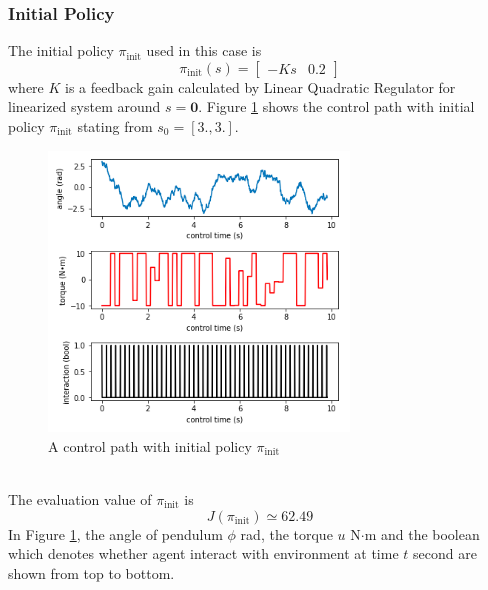 \documentclass[english, dvipdfmx]{ampmt}             %
\begin{document}
\subsubsection{Initial Policy}
The initial policy $\pi_{\textrm{init}}$ used in this case is
\begin{equation}
	\pi_{\textrm{init}}(s) = \begin{bmatrix}-Ks&0.2\end{bmatrix}
\end{equation}
where $K$ is a feedback gain calculated by Linear Quadratic Regulator for linearized system around $s = \bm{0}$. Figure \ref{sample_02} shows the control path with initial policy $\pi_{\textrm{init}}$ stating from $s_0 = [3., 3.]$.
\begin{figure}[h]
	\centering
 	\includegraphics[width=8cm]{sample_02.png}
 	\caption{A control path with initial policy $\pi_{\textrm{init}}$} \label{sample_02}
\end{figure}\\
The evaluation value of $\pi_{\textrm{init}}$ is
\begin{equation}
	J(\pi_{\textrm{init}}) \simeq 62.49
\end{equation}
In Figure \ref{sample_02}, the angle of pendulum $\phi$ rad, the torque $u$ N$\cdot$m and the boolean which denotes whether agent interact with environment at time $t$ second are shown from top to bottom.
\end{document}
